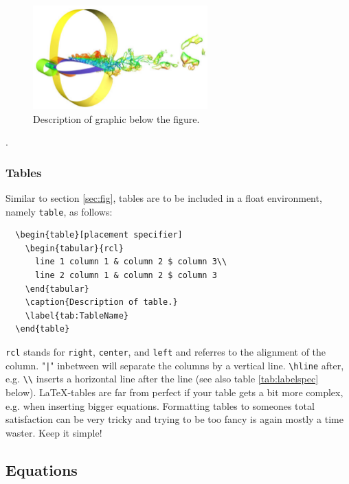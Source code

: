 \begin{figure}[placement specifier]
  \centering
  \includegraphics[width=0.6\textwidth]{./fig/example}
  \caption[Referenced name in the figure list]{Description of graphic below the figure.}
  \label{fig:GraphicLabel}
\end{figure}.

\subsubsection{Tables}
\label{sec:tab}

Similar to section \ref{sec:fig}, tables are to be included in a float
environment, namely \verb!table!, as follows:

\begin{verbatim}
  \begin{table}[placement specifier]
    \begin{tabular}{rcl}
      line 1 column 1 & column 2 $ column 3\\
      line 2 column 1 & column 2 $ column 3
    \end{tabular}
    \caption{Description of table.}
    \label{tab:TableName}
  \end{table}
\end{verbatim}

\verb!rcl! stands for \verb!right!, \verb!center!, and \verb!left! and
referres to the alignment of the column. "\verb!|!" inbetween will separate
the columns by a vertical line. \verb!\hline! after, e.g. \verb!\\! inserts a
horizontal line after the line (see also table \ref{tab:labelspec}
below). \LaTeX-tables are far from perfect if your table gets a bit more
complex, e.g. when inserting bigger equations. Formatting tables to someones
total satisfaction can be very tricky and trying to be too fancy is again
mostly a time waster. Keep it simple!

\subsection{Equations}
\label{sec:eq}

